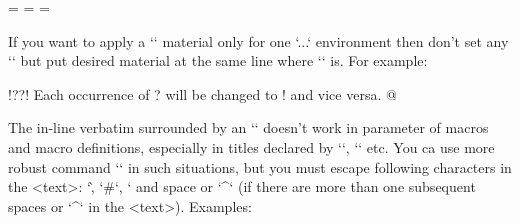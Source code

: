 \begtt
\everytt={\typosize[9/11]}      %
\everytt={}            %
\everytt={} %
\endtt

\new
If you want to apply a `\everytt` material only for one `\begtt...\endtt`
environment then don't set any `\everytt` but put desired material at the 
same line where `\begtt` is. For example:

\begtt   \adef@{\string\endtt}
\begtt   \adef!{?}\adef?{!}
Each occurrence of ? will be changed to ! and vice versa. 
@
\endtt

The in-line verbatim surrounded by an `\activettchar` doesn't work in
parameter of macros and macro definitions, especially in titles declared by
`\chap`, `\sec` etc. 
\new
You ca use more robust command `` in such
situations, but you must escape following characters in the <text>:
`\`, `#`, `%
and space or `^` (if there are more than one subsequent spaces or `^` in 
the <text>). Examples:

